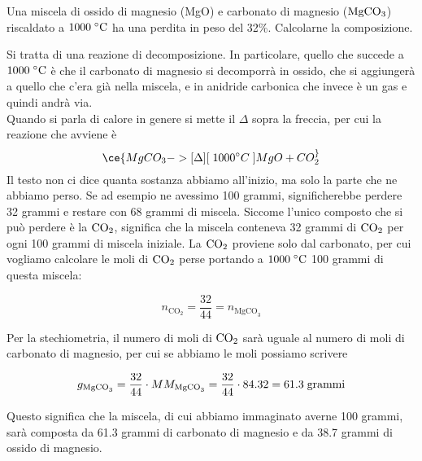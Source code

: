 \begin{esercizio}
    Una miscela di ossido di magnesio (MgO) e carbonato di magnesio ($\rm MgCO_3$) riscaldato a $1000 \; ^{\circ} \rm C$ ha una perdita in peso del 32\%. Calcolarne la composizione.
\end{esercizio}
\begin{soluzione}
    Si tratta di una reazione di decomposizione. In particolare, quello che succede a $1000 \; ^{\circ} \rm C$ è che il carbonato di magnesio si decomporrà in ossido, che si aggiungerà a quello che c'era già nella miscela, e in anidride carbonica che invece è un gas e quindi andrà via.\\
    Quando si parla di calore in genere si mette il $\Delta$ sopra la freccia, per cui la reazione che avviene è
    \begin{equation*}
        \ce{MgCO_3 ->[{\Delta}][{\; 1000 ^{\circ}C \;}] MgO + CO_2 ^}
    \end{equation*}
    Il testo non ci dice quanta sostanza abbiamo all'inizio, ma solo la parte che ne abbiamo perso. Se ad esempio ne avessimo 100 grammi, significherebbe perdere 32 grammi e restare con 68 grammi di miscela. Siccome l'unico composto che si può perdere è la $\rm CO_2$, significa che la miscela conteneva 32 grammi di $\rm CO_2$ per ogni 100 grammi di miscela iniziale. La $\rm CO_2$ proviene solo dal carbonato, per cui vogliamo calcolare le moli di $\rm CO_2$ perse portando a $1000 \; ^{\circ} \rm C$ 100 grammi di questa miscela:

$$n_{\text{CO}_2}=\frac{32}{44}=n_{\text{MgCO}_3}$$

Per la stechiometria, il numero di moli di $\rm CO_2$ sarà uguale al numero di moli di carbonato di magnesio, per cui se abbiamo le moli possiamo scrivere

$$g_{\text{MgCO}_3}=\frac{32}{44} \cdot MM_{\text{MgCO}_3}
=\frac{32}{44} \cdot 84.32=61.3 \; \rm grammi$$

Questo significa che la miscela, di cui abbiamo immaginato averne 100 grammi, sarà composta da 61.3 grammi di carbonato di magnesio e da 38.7 grammi di ossido di magnesio.

\end{soluzione}

\newpage


